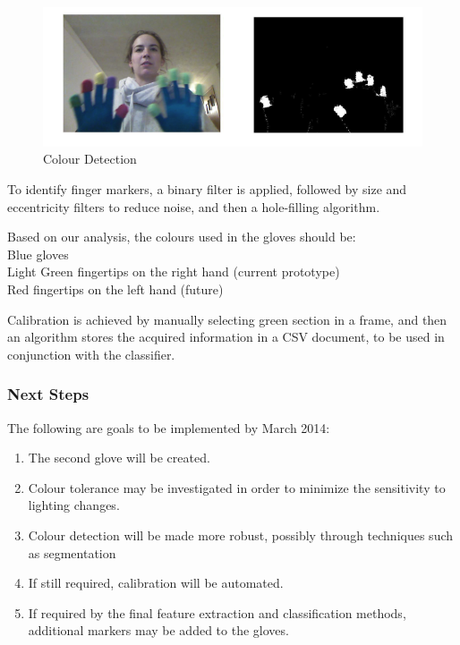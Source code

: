 \documentclass[12pt]{article}
\begin{document}
\begin{figure}[h]
  \centering
  \includegraphics[scale=1]{BinaryTest.png}
  \caption{Colour Detection}
  \label{fig:salience}
\end{figure}

To identify finger markers, a binary filter is applied, followed by size and eccentricity filters to reduce noise, and then a hole-filling algorithm.

Based on our analysis, the colours used in the gloves should be: \\
\hspace*{1cm} Blue gloves \\
\hspace*{1cm} Light Green fingertips on the right hand (current prototype) \\
\hspace*{1cm} Red fingertips on the left hand (future)


Calibration is achieved by manually selecting green section in a frame, and then an algorithm stores the acquired information in a CSV document, to be used in conjunction with the classifier.

\subsubsection{Next Steps}
The following are goals to be implemented by March 2014:
\begin{enumerate}
	\item The second glove will be created.
	\item Colour tolerance may be investigated in order to minimize the sensitivity to lighting changes.
	\item Colour detection will be made more robust, possibly through techniques such as segmentation
	\item If still required, calibration will be automated. 
	\item If required by the final feature extraction and classification methods, additional markers may be added to the gloves.
\end{enumerate}
\end{document}
